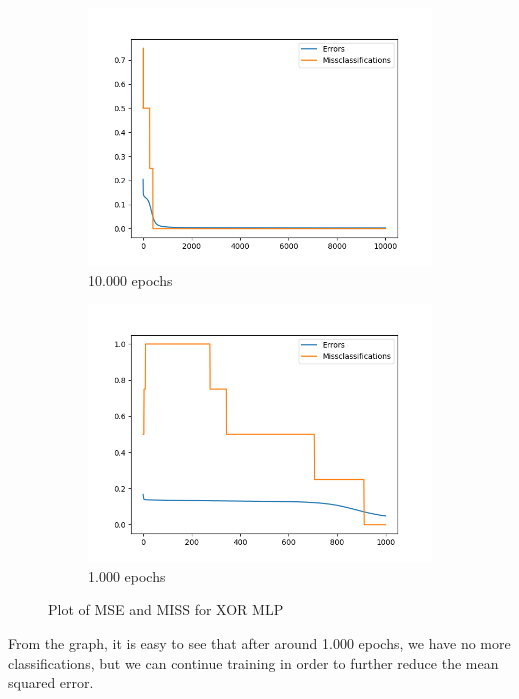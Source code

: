 \documentclass[12pt]{article}
\begin{document}
\begin{figure}[h!]
	\centering
	\begin{subfigure}{.49\linewidth}
	  \centering
	  \includegraphics[width=\linewidth]{img/xor10000.png}
	  \caption{10.000 epochs}
	  \label{fig:xor10000}
	\end{subfigure}
	\begin{subfigure}{.49\linewidth}
	  \centering
	  \includegraphics[width=\linewidth]{img/xor1000.png}
	  \caption{1.000 epochs}
	  \label{fig:xor1000}
	\end{subfigure}
	\caption{Plot of MSE and MISS for XOR MLP}
	\label{fig:test}
\end{figure}

\noindent
From the graph, it is easy to see that after around 1.000 epochs, we have no more classifications, but we can continue training in order to further reduce the mean squared error. 
\end{document}
